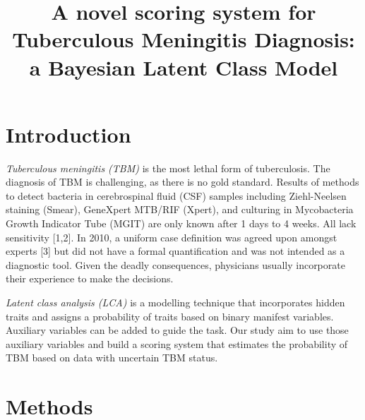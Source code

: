 \documentclass[
  12pt,
]{article}
\title{A novel scoring system for Tuberculous Meningitis Diagnosis: a Bayesian Latent Class Model}
\author{}
\date{\vspace{-2.5em}}
\begin{document}
\maketitle

\doublespacing

\hypertarget{introduction}{%
\section{Introduction}\label{introduction}}

\emph{Tuberculous meningitis (TBM)} is the most lethal form of tuberculosis. The diagnosis of TBM is challenging, as there is no gold standard. Results of methods to detect bacteria in cerebrospinal fluid (CSF) samples including Ziehl-Neelsen staining (Smear), GeneXpert MTB/RIF (Xpert), and culturing in Mycobacteria Growth Indicator Tube (MGIT) are only known after 1 days to 4 weeks. All lack sensitivity {[}1,2{]}. In 2010, a uniform case definition was agreed upon amongst experts {[}3{]} but did not have a formal quantification and was not intended as a diagnostic tool. Given the deadly consequences, physicians usually incorporate their experience to make the decisions.

\emph{Latent class analysis (LCA)} is a modelling technique that incorporates hidden traits and assigns a probability of traits based on binary manifest variables. Auxiliary variables can be added to guide the task. Our study aim to use those auxiliary variables and build a scoring system that estimates the probability of TBM based on data with uncertain TBM status.

\hypertarget{methods}{%
\section{Methods}\label{methods}}
\end{document}
